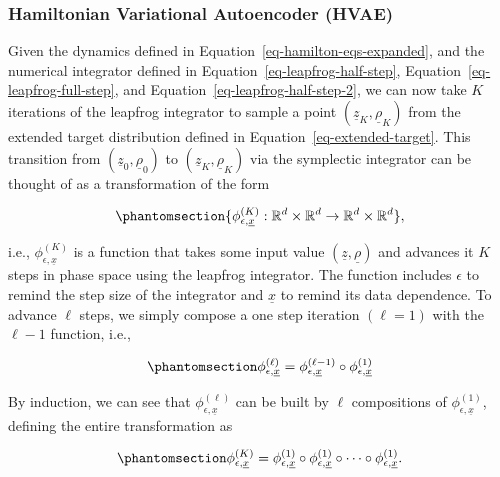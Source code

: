 \documentclass[
]{scrartcl}
\begin{document}
\begin{refsection}
\subsubsection{Hamiltonian Variational Autoencoder
(HVAE)}\label{hamiltonian-variational-autoencoder-hvae}

Given the dynamics defined in Equation~\ref{eq-hamilton-eqs-expanded},
and the numerical integrator defined in
Equation~\ref{eq-leapfrog-half-step},
Equation~\ref{eq-leapfrog-full-step}, and
Equation~\ref{eq-leapfrog-half-step-2}, we can now take \(K\) iterations
of the leapfrog integrator to sample a point
\((\underline{z}_K, \underline{\rho}_K)\) from the extended target
distribution defined in Equation~\ref{eq-extended-target}. This
transition from \((\underline{z}_0, \underline{\rho}_0)\) to
\((\underline{z}_K,
\underline{\rho}_K)\) via the symplectic integrator can be thought of as
a transformation of the form

\begin{equation}\phantomsection\label{eq-iterates}{
\{\phi_{\epsilon,\underline{x}}^{(K)} : 
\mathbb{R}^d \times \mathbb{R}^d \to \mathbb{R}^d \times \mathbb{R}^d\},
}\end{equation}

i.e., \(\phi_{\epsilon,\underline{x}}^{(K)}\) is a function that takes
some input value \((\underline{z}, \underline{\rho})\) and advances it
\(K\) steps in phase space using the leapfrog integrator. The function
includes \(\epsilon\) to remind the step size of the integrator and
\(\underline{x}\) to remind its data dependence. To advance \(\ell\)
steps, we simply compose a one step iteration \((\ell=1)\) with the
\(\ell-1\) function, i.e.,

\begin{equation}\phantomsection\label{eq-composition}{
\phi_{\epsilon,\underline{x}}^{(\ell)} = 
\phi_{\epsilon,\underline{x}}^{(\ell-1)} \circ \phi_{\epsilon,\underline{x}}^{(1)}
}\end{equation}

By induction, we can see that \(\phi_{\epsilon,\underline{x}}^{(\ell)}\)
can be built by \(\ell\) compositions of
\(\phi_{\epsilon,\underline{x}}^{(1)}\), defining the entire
transformation as

\begin{equation}\phantomsection\label{eq-transformation}{
\phi_{\epsilon,\underline{x}}^{(K)} = \phi_{\epsilon,\underline{x}}^{(1)} \circ
\phi_{\epsilon,\underline{x}}^{(1)} \circ \cdots \circ \phi_{\epsilon,\underline{x}}^{(1)}.
}\end{equation}


\end{refsection}
\end{document}
